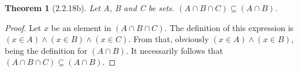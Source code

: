 \documentclass[a4paper, 12pt]{article}
\theoremstyle{plain}
\newtheorem*{theorem*}{Theorem}
\begin{document}
	
	\begin{theorem*}[2.2.18b]
		Let A, B and C be sets. $(A \cap B \cap C) \subseteq (A \cap B)$.
	\end{theorem*}
	
	\begin{proof}
		Let $x$ be an element in $(A \cap B \cap C)$. The definition of this expression is 
		$(x \in A) \land (x \in B) \land (x \in C)$. From that, obviously 
		$(x \in A) \land (x \in B)$, being the definition for $(A \cap B)$. It necessarily 
		follows that $(A \cap B \cap C) \subseteq (A \cap B)$.
	\end{proof}
\end{document}
